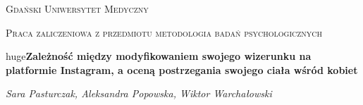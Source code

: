 \documentclass[12pt]{article}
\begin{document}
    \begin{titlepage}
        \centering
        {\scshape\LARGE Gdański Uniwersytet Medyczny \par}
        \vspace{1cm}
        {\scshape\Large Praca zaliczeniowa z przedmiotu metodologia badań psychologicznych \par}
        \vspace{1cm}
        {huge\bfseries Zależność między modyfikowaniem swojego wizerunku na platformie Instagram, a oceną postrzegania swojego ciała wśród kobiet \par}
        \vspace{1cm}
        {\Large\itshape Sara Pasturczak, Aleksandra Popowska, Wiktor Warchałowski \par}
    \end{titlepage}
\end{document}
